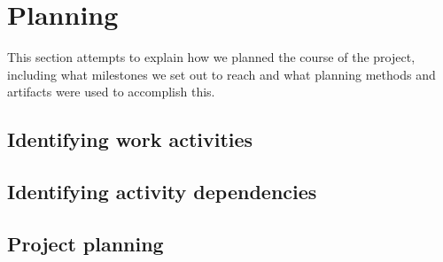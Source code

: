 \section{Planning}
This section attempts to explain how we planned the course of the project, including what milestones we set out to reach and what planning methods and artifacts were used to accomplish this.
\label{sec:EmpiriPlanning}
\subsection{Identifying work activities}

\subsection{Identifying activity dependencies}

\subsection{Project planning}
